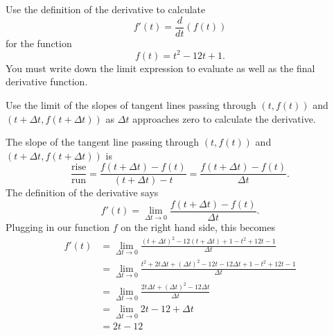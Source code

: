 \documentclass{ximera}
\author{Emma Smith Zbarsky}
\begin{document}
\begin{exercise}

Use the definition of the derivative to calculate
\[f'(t) = \frac{d}{dt}(f(t))\] for the function \[f(t) = t^2-12t+1.\]
You must write down the limit expression to evaluate as well as the
final derivative function.


\begin{hint}
Use the limit of the slopes of tangent lines passing through $(t,f(t))$
and $(t+\Delta t,f(t+\Delta t))$ as $\Delta t$ approaches zero to
calculate the derivative.
\end{hint}


\begin{hint}
The slope of the tangent line passing through $(t,f(t))$ and
$(t+\Delta t, f(t+\Delta t))$ is
\[\frac{\mbox{rise}}{\mbox{run}} = \frac{f(t+\Delta t) - f(t)}{(t+\Delta t)-t} = \frac{f(t+\Delta t)-f(t)}{\Delta t}.\]
The definition of the derivative says
\[f'(t) = \lim_{\Delta t \to 0} \frac{f(t+\Delta t)-f(t)}{\Delta t}.\]
Plugging in our function $f$ on the right hand side, this becomes
\begin{align*} f'(t) &= \lim_{\Delta t \to 0} \frac{(t+\Delta t)^2-12(t+\Delta t)+1-t^2+12t-1}{\Delta t} \\
&= \lim_{\Delta t \to 0} \frac{t^2+2t\Delta t+(\Delta t)^2-12t-12\Delta t+1-t^2+12t-1}{\Delta t} \\
&= \lim_{\Delta t \to 0} \frac{2t\Delta t+(\Delta t)^2-12\Delta t}{\Delta t} \\
&= \lim_{\Delta t \to 0} 2t-12 + \Delta t \\
&= \boxed{2t-12}
\end{align*}
\end{hint}


\begin{multipleChoice}
\end{multipleChoice}

\end{exercise}
\end{document}
